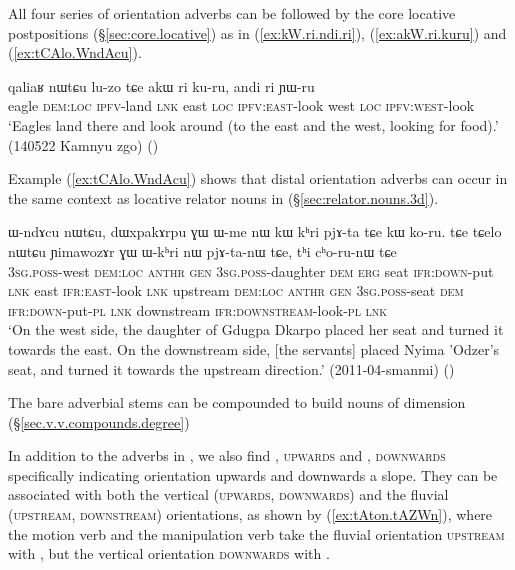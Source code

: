 All four series of orientation adverbs can be followed by the core locative postpositions (§\ref{sec:core.locative}) as in (\ref{ex:kW.ri.ndi.ri}), (\ref{ex:akW.ri.kuru}) and (\ref{ex:tCAlo.WndAcu}).

 \begin{exe}
\ex \label{ex:akW.ri.kuru}
\gll qaliaʁ nɯtɕu lu-zo tɕe akɯ ri ku-ru, andi ri ɲɯ-ru   \\
eagle \textsc{dem}:\textsc{loc} \textsc{ipfv}-land \textsc{lnk} east \textsc{loc} \textsc{ipfv}:\textsc{east}-look west \textsc{loc} \textsc{ipfv}:\textsc{west}-look \\
\glt `Eagles land there and look around (to the east and the west, looking for food).' (140522 Kamnyu zgo)
()
 \end{exe}
 
 Example (\ref{ex:tCAlo.WndAcu}) shows that distal orientation adverbs can occur in the same context as locative relator nouns in  (§\ref{sec:relator.nouns.3d}).

 \begin{exe}
\ex \label{ex:tCAlo.WndAcu}
\gll ɯ-ndɤcu nɯtɕu, dɯxpakɤrpu ɣɯ ɯ-me nɯ kɯ kʰri pjɤ-ta tɕe kɯ ko-ru.
tɕe tɕelo nɯtɕu ɲimawozɤr ɣɯ ɯ-kʰri nɯ pjɤ-ta-nɯ tɕe, tʰi cʰo-ru-nɯ tɕe \\
\textsc{3sg}.\textsc{poss}-west \textsc{dem}:\textsc{loc}  \textsc{anthr} \textsc{gen} \textsc{3sg}.\textsc{poss}-daughter \textsc{dem} \textsc{erg} seat \textsc{ifr}:\textsc{down}-put \textsc{lnk} east \textsc{ifr}:\textsc{east}-look  \textsc{lnk} upstream \textsc{dem}:\textsc{loc}  \textsc{anthr} \textsc{gen} \textsc{3sg}.\textsc{poss}-seat \textsc{dem} \textsc{ifr}:\textsc{down}-put-\textsc{pl} \textsc{lnk} downstream \textsc{ifr}:\textsc{downstream}-look-\textsc{pl} \textsc{lnk} \\ 
\glt `On the west side, the daughter of Gdugpa Dkarpo placed her seat and turned it towards the east. On the downstream side, [the servants] placed Nyima 'Odzer's seat, and turned it towards the upstream direction.' (2011-04-smanmi)
()
 \end{exe}

The bare adverbial stems can be compounded to build nouns of dimension (§\ref{sec.v.v.compounds.degree})

In addition to the adverbs in , we also find , \textsc{upwards} and , \textsc{downwards} specifically indicating orientation upwards and downwards a slope. They can be associated with both the vertical (\textsc{upwards}, \textsc{downwards}) and the fluvial (\textsc{upstream}, \textsc{downstream}) orientations, as shown by (\ref{ex:tAton.tAZWn}), where the motion verb  and the manipulation verb  take the fluvial orientation \textsc{upstream} with , but the vertical orientation \textsc{downwards} with .

